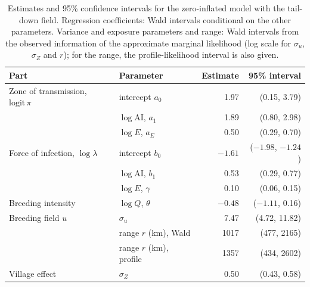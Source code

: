\documentclass[11pt,a4paper]{article}
\newcommand{\AI}{\mathrm{AI}}
\begin{document}
\begin{table}[H]
\centering
\caption{Estimates and 95\% confidence intervals for the zero-inflated model with the tail-down field. Regression coefficients: Wald intervals conditional on the other parameters. Variance and exposure parameters and range: Wald intervals from the observed information of the approximate marginal likelihood (log scale for $\sigma_u$, $\sigma_Z$ and $r$); for the range, the profile-likelihood interval is also given.}
\label{tab:ci}
\begin{tabular}{llrr}
\toprule
Part & Parameter & Estimate & 95\% interval \\
\midrule
Zone of transmission, $\mathrm{logit}\,\pi$ & intercept $a_0$ & 1.97 & (0.15, 3.79) \\
 & $\log \AI$, $a_1$ & 1.89 & (0.80, 2.98) \\
 & $\log E$, $a_E$ & 0.50 & (0.29, 0.70) \\
Force of infection, $\log\lambda$ & intercept $b_0$ & $-1.61$ & ($-1.98$, $-1.24$) \\
 & $\log \AI$, $b_1$ & 0.53 & (0.29, 0.77) \\
 & $\log E$, $\gamma$ & 0.10 & (0.06, 0.15) \\
Breeding intensity & $\log Q$, $\theta$ & $-0.48$ & ($-1.11$, 0.16) \\
Breeding field $u$ & $\sigma_u$ & 7.47 & (4.72, 11.82) \\
 & range $r$ (km), Wald & 1017 & (477, 2165) \\
 & range $r$ (km), profile & 1357 & (434, 2602) \\
Village effect & $\sigma_Z$ & 0.50 & (0.43, 0.58) \\
\bottomrule
\end{tabular}
\end{table}
\end{document}
